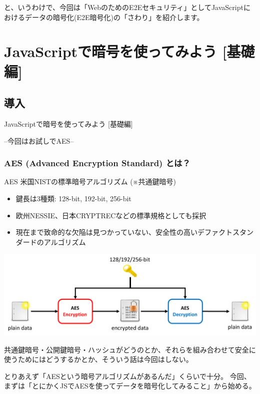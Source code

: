 \documentclass[12pt,dvipdfmx]{beamer}
\begin{document}
\begin{frame}
と、いうわけで、今回は「WebのためのE2Eセキュリティ」としてJavaScriptにおけるデータの暗号化(E2E暗号化)の「さわり」を紹介します。
\end{frame}

\section{JavaScriptで暗号を使ってみよう [基礎編]}

\subsection{導入}
\begin{frame}
\centering
{\Large JavaScriptで暗号を使ってみよう [基礎編]}

\vspace{1ex}
--今回はお試しでAES--

\end{frame}

\begin{frame}
\frametitle{AES (Advanced Encryption Standard) とは？}
\begin{block}{AES}
米国NISTの標準暗号アルゴリズム (※共通鍵暗号)\\
\begin{itemize}
 \item 鍵長は3種類: 128-bit, 192-bit, 256-bit
 \item 欧州NESSIE、日本CRYPTRECなどの標準規格としても採択
 \item 現在まで致命的な欠陥は見つかっていない、安全性の高い\alert{デファクトスタンダード}のアルゴリズム
\end{itemize}
\end{block}
\begin{center}
\includegraphics[width=0.9\linewidth]{Figs/aes_flow.pdf}
\end{center}
\end{frame}

\begin{frame}
共通鍵暗号・公開鍵暗号・ハッシュがどうのとか、それらを組み合わせて安全に使うためにはどうするかとか、そういう話は今回はしない。

\vspace{1ex}

とりあえず「AESという暗号アルゴリズムがあるんだ」くらいで十分。
今回、まずは「\alert{とにかくJSでAESを使ってデータを暗号化してみること}」から始める。
\end{frame}
\end{document}
